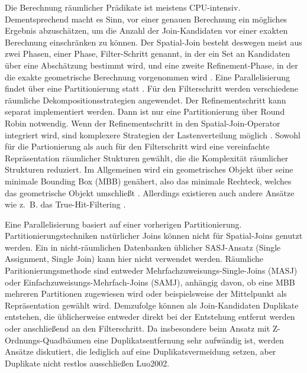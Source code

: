 \documentclass[a4paper,12pt,twoside]{article}
\begin{document}
Die Berechnung räumlicher Prädikate ist meistens CPU-intensiv. Dementsprechend macht es Sinn, vor einer genauen Berechnung ein mögliches Ergebnis abzuschätzen, um die Anzahl der Join-Kandidaten vor einer exakten Berechnung einschränken zu können. Der Spatial-Join besteht deswegen meist aus zwei Phasen, einer Phase, Filter-Schritt genannt, in der ein Set an Kandidaten über eine Abschätzung bestimmt wird, und eine zweite Refinement-Phase, in der die exakte geometrische Berechnung vorgenommen wird {\autocite[S. 309f]{Rigaux2001}}. Eine Parallelisierung findet über eine Partitionierung statt {\autocite{Zhou1998}}. Für den Filterschritt werden verschiedene räumliche Dekompositionsstrategien angewendet. Der Refinementschritt kann separat implementiert werden. Dann ist nur eine Partitionierung über Round Robin notwendig. Wenn der Refinementschritt in den Spatial-Join-Operator integriert wird, sind komplexere Strategien der Lastenverteilung möglich {\autocite{Brinkhoff1996}}. Sowohl für die Partionierung als auch für den Filterschritt wird eine vereinfachte Repräsentation räumlicher Stukturen gewählt, die die Komplexität räumlicher Strukturen reduziert. Im Allgemeinen wird ein geometrisches Objekt über seine minimale Bounding Box (MBB) genähert, also das minimale Rechteck, welches das geometrische Objekt umschließt {\autocite[S. 202f]{Rigaux2001}}. Allerdings existieren auch andere Ansätze wie z.~B. das True-Hit-Filtering {\autocite{Bouros2019}}.

Eine Parallelisierung basiert auf einer vorherigen Partitionierung. Partitionierungstechniken natürlicher Joins können nicht für Spatial-Joins genutzt werden. Ein in nicht-räumlichen Datenbanken üblicher SASJ-Ansatz (Single Assignment, Single Join) kann hier nicht verwendet werden. Räumliche Paritionierungsmethode sind entweder Mehrfachzuweisungs-Single-Joins (MASJ) oder Einfachzuweisungs-Mehrfach-Joins (SAMJ), anhängig davon, ob eine MBB mehreren Partitionen zugewiesen wird oder beispielsweise der Mittelpunkt als Repräsentation gewählt wird. Demzufolge können als Join-Kandidaten Duplikate entstehen, die üblicherweise entweder direkt bei der Entstehung entfernt werden oder anschließend an den Filterschritt. Da insbesondere beim Ansatz mit Z-Ordnungs-Quadbäumen eine Duplikatsentfernung sehr aufwändig ist, werden Ansätze diskutiert, die lediglich auf eine Duplikatsvermeidung setzen, aber Duplikate nicht restlos ausschließen {\autocite{Jacox2007}{Luo2002}}. 
\end{document}
